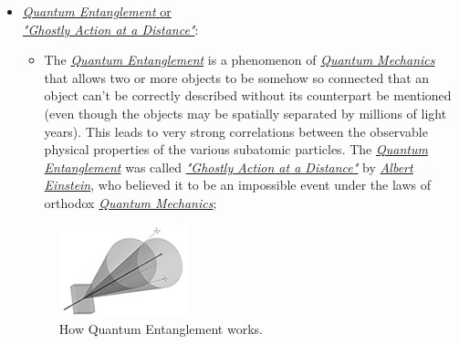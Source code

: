 \documentclass[conference]{IEEEtran}
\begin{document}
\begin{itemize}
  \item \href{https://en.wikipedia.org/wiki/Quantum_entanglement}{\textit{Quantum Entanglement} or \\\textit{"Ghostly Action at a Distance"}}:
   
    \begin{itemize}
        \item The \href{https://en.wikipedia.org/wiki/Quantum_entanglement}{\textit{Quantum Entanglement}} is a phenomenon of \href{https://en.wikipedia.org/wiki/Quantum_mechanics}{\textit{Quantum Mechanics}} that allows two or more objects to be somehow so connected that an object can't be correctly described without its counterpart be mentioned (even though the objects may be spatially separated by millions of light years). This leads to very strong correlations between the observable physical properties of the various subatomic particles. The \href{https://en.wikipedia.org/wiki/Quantum_entanglement}{\textit{Quantum Entanglement}} was called \href{https://en.wikipedia.org/wiki/Quantum_entanglement}{\textit{"Ghostly Action at a Distance"}} by \href{https://en.wikipedia.org/wiki/Albert_Einstein}{\textit{Albert Einstein}}, who believed it to be an impossible event under the laws of orthodox \href{https://en.wikipedia.org/wiki/Quantum_mechanics}{\textit{Quantum Mechanics}};
    \end{itemize}
    \begin{center}
      \begin{figure}[htbp]
        \centerline{\includegraphics{fig2.png}}
        \caption{How Quantum Entanglement works.}
        \label{fig}
      \end{figure}
  \end{center}
  
\end{itemize}

\newpage
\end{document}
